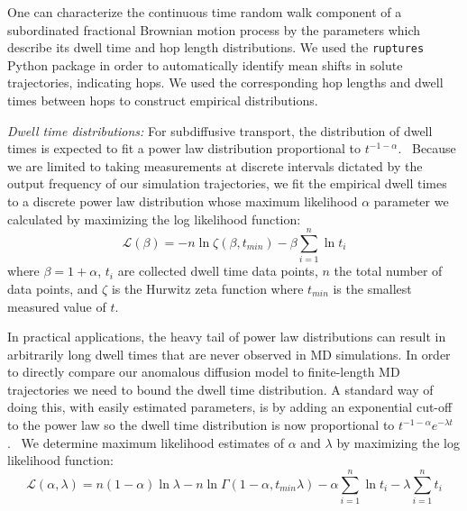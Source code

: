 \documentclass[journal=jctcce,manuscript=article]{achemso}
\begin{document}
  One can characterize the continuous time random walk component of a subordinated
  fractional Brownian motion process by the parameters which describe its dwell 
  time and hop length distributions. We used the \texttt{ruptures} Python package
  in order to automatically identify mean shifts in solute trajectories, indicating
  hops.\cite{truong_ruptures:_2018} We used the corresponding hop lengths and dwell
  times between hops to construct empirical distributions.
  
  \textit{Dwell time distributions:} For subdiffusive transport, the distribution 
  of dwell times is expected to fit a power law distribution 
  proportional to $t^{-1-\alpha}$.~\cite{meroz_toolbox_2015}
  Because we are limited to taking measurements at discrete intervals dictated by the output 
  frequency of our simulation trajectories, we fit the empirical dwell times
  to a discrete power law distribution whose maximum likelihood $\alpha$ 
  parameter we calculated by maximizing the log likelihood function: 
  \begin{equation}
	\mathcal{L}(\beta) = -n\ln \zeta(\beta, t_{min}) -
	\beta\sum_{i=1}^{n} \ln t_i 
  \label{eqn:powerlaw_likelihood}
  \end{equation}
  where $\beta = 1 + \alpha$, $t_i$ are collected dwell time data points,
  $n$ the total number of data points, and $\zeta$ is the Hurwitz zeta function
  where $t_{min}$ is the smallest measured value of $t$.~\cite{clauset_power-law_2009}
  
  In practical applications, the heavy tail of power law distributions can result in 
  arbitrarily long dwell times that are never observed in MD simulations. 
  In order to directly compare our anomalous diffusion model to finite-length MD 
  trajectories we need to bound the dwell time distribution. A standard way of 
  doing this, with easily estimated parameters, is by adding an exponential 
  cut-off to the power law so the dwell time distribution is now proportional 
  to $t^{-1 - \alpha}e^{-\lambda t}$.~\cite{newman_power_2005,clauset_power-law_2009}  %
  We determine maximum likelihood estimates of $\alpha$ and $\lambda$ by maximizing
  the log likelihood function:~\cite{clauset_power-law_2009}
  \begin{equation}
    \mathcal{L}(\alpha, \lambda) = n(1 - \alpha)\ln\lambda - n\ln\Gamma(1 - \alpha, t_{min}\lambda) - \alpha\sum_{i=1}^{n}\ln t_i - \lambda\sum_{i=1}^n t_i
  \label{eqn:powerlaw_cutoff_likelihood}
  \end{equation}
  
\end{document}
